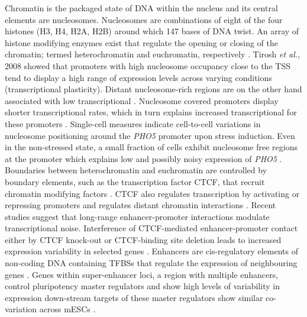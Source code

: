 Chromatin is the packaged state of DNA within the nucleus and its central elements are nucleosomes. 
Nucleosomes are combinations of eight of the four histones (H3, H4, H2A, H2B) around which 147 bases of DNA twist. 
An array of histone modifying enzymes exist that regulate the opening or closing of the chromatin; termed heterochromatin and euchromatin, respectively \citep{Kouzarides2007}. 
Tirosh \textit{et al.}, 2008 showed that promoters with high nucleosome occupancy close to the TSS tend to display a high range of expression levels across varying conditions (transcriptional plasticity). 
Distant nucleosome-rich regions are on the other hand associated with low transcriptional  \citep{Tirosh2008}. 
Nucleosome covered promoters display shorter transcriptional rates, which in turn explains increased transcriptional  for these promoters \cite{Dey2015}. 
Single-cell measures indicate cell-to-cell variations in nucleosome positioning around the \textit{PHO5} promoter upon stress induction. 
Even in the non-stressed state, a small fraction of cells exhibit nucleosome free regions at the promoter which explains low and possibly noisy expression of \textit{PHO5} \citep{Small2014}.
 \\

Boundaries between heterochromatin and euchromatin are controlled by boundary elements, such as the transcription factor \Gls{CTCF}, that recruit chromatin modifying factors \citep{Kouzarides2007}. 
CTCF also regulates transcription by activating or repressing promoters and regulates distant chromatin interactions \citep{Kim2015a}. 
Recent studies suggest that long-range enhancer-promoter interactions modulate transcriptional noise. 
Interference of CTCF-mediated enhancer-promoter contact either by CTCF knock-out or CTCF-binding site deletion leads to increased expression variability in selected genes \citep{Ren2017}. 
Enhancers are cis-regulatory elements of non-coding DNA containing TFBSs that regulate the expression of neighbouring genes \citep{Blackwood1998}. 
Genes within super-enhancer loci, a region with multiple enhancers, control pluripotency master regulators and show high levels of variability in expression down-stream targets of these master regulators show similar co-variation across mESCs \citep{Faure2017}.

